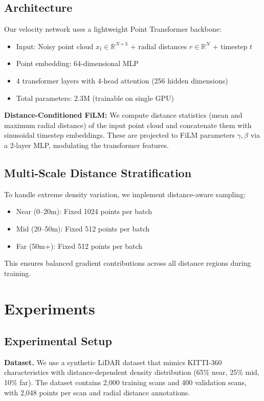 \documentclass{article}
\begin{document}
\subsection{Architecture}

Our velocity network uses a lightweight Point Transformer backbone:
\begin{itemize}
    \item Input: Noisy point cloud $x_t \in \mathbb{R}^{N \times 3}$ + radial distances $r \in \mathbb{R}^N$ + timestep $t$
    \item Point embedding: 64-dimensional MLP
    \item 4 transformer layers with 4-head attention (256 hidden dimensions)
    \item Total parameters: 2.3M (trainable on single GPU)
\end{itemize}

\textbf{Distance-Conditioned FiLM:} We compute distance statistics (mean and maximum radial distance) of the input point cloud and concatenate them with sinusoidal timestep embeddings. These are projected to FiLM parameters $\gamma, \beta$ via a 2-layer MLP, modulating the transformer features.

\subsection{Multi-Scale Distance Stratification}

To handle extreme density variation, we implement distance-aware sampling:
\begin{itemize}
    \item Near (0--20m): Fixed 1024 points per batch
    \item Mid (20--50m): Fixed 512 points per batch  
    \item Far (50m+): Fixed 512 points per batch
\end{itemize}
This ensures balanced gradient contributions across all distance regions during training.

\section{Experiments}

\subsection{Experimental Setup}

\textbf{Dataset.} We use a synthetic LiDAR dataset that mimics KITTI-360 characteristics with distance-dependent density distribution (65\% near, 25\% mid, 10\% far). The dataset contains 2,000 training scans and 400 validation scans, with 2,048 points per scan and radial distance annotations.
\end{document}
